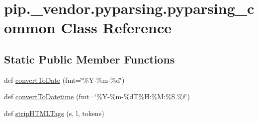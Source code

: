 \hypertarget{classpip_1_1__vendor_1_1pyparsing_1_1pyparsing__common}{}\section{pip.\+\_\+vendor.\+pyparsing.\+pyparsing\+\_\+common Class Reference}
\label{classpip_1_1__vendor_1_1pyparsing_1_1pyparsing__common}
\subsection*{Static Public Member Functions}
\begin{DoxyCompactItemize}
\item 
def \hyperlink{classpip_1_1__vendor_1_1pyparsing_1_1pyparsing__common_a4e94dcf87ca3c72e569ed1f350e1557e}{convert\+To\+Date} (fmt=\char`\"{}\%Y-\/\%m-\/\%d\char`\"{})
\item 
def \hyperlink{classpip_1_1__vendor_1_1pyparsing_1_1pyparsing__common_a63ddf1630dca0a46873eaee404d0264e}{convert\+To\+Datetime} (fmt=\char`\"{}\%Y-\/\%m-\/\%dT\%H\+:\%M\+:\%S.\%f\char`\"{})
\item 
def \hyperlink{classpip_1_1__vendor_1_1pyparsing_1_1pyparsing__common_addd017ae430585480cddba7df09fcbed}{strip\+H\+T\+M\+L\+Tags} (s, l, tokens)
\end{DoxyCompactItemize}
